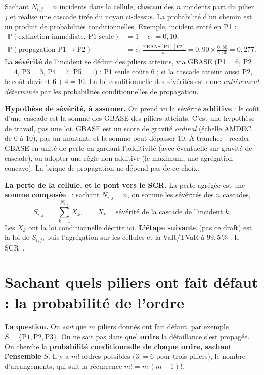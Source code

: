 \documentclass[11pt,a4paper]{article}
\begin{document}
Sachant $N_{i,j}=n$ incidents dans la cellule, \textbf{chacun} des $n$ incidents part du
pilier~$j$ et réalise une cascade tirée du noyau ci-dessus. La probabilité d'un chemin est un
produit de probabilités conditionnelles. Exemple, incident entré en P1 :
\begin{align}
\mathbb P(\text{extinction immédiate, P1 seule}) &= 1-e_1 = 0{,}10, \\
\mathbb P(\text{propagation P1}\to\text{P2}) &= e_1\,\tfrac{\text{TRANS}[\text{P1}][\text{P2}]}{s_1} = 0{,}90\times\tfrac{0{,}80}{2{,}60} = 0{,}277 .
\end{align}
La \textbf{sévérité} de l'incident se déduit des piliers atteints, via GBASE
(P1$=6$, P2$=4$, P3$=3$, P4$=7$, P5$=1$) : \og{}P1 seule\fg{} coûte $6$ ; si la cascade atteint
aussi P2, le coût devient $6+4=10$. La loi conditionnelle des sévérités est donc
\emph{entièrement déterminée} par les probabilités conditionnelles de propagation.

\noindent\textbf{Hypothèse de sévérité, à assumer.} On prend ici la sévérité \textbf{additive} :
le coût d'une cascade est la somme des GBASE des piliers atteints. C'est une hypothèse de travail,
pas une loi. GBASE est un score de gravité \emph{ordinal} (échelle AMDEC de 0 à 10), pas un
montant, et la somme peut dépasser 10. À trancher : recaler GBASE en unité de perte en gardant
l'additivité (avec éventuelle sur-gravité de cascade), ou adopter une règle non additive (le
maximum, une agrégation concave). La brique de propagation ne dépend pas de ce choix.

\begin{cle}
\textbf{La perte de la cellule, et le pont vers le SCR.} La perte agrégée est une
\textbf{somme composée}~\cite{Buhlmann1970,KlugmanPanjerWillmot} : sachant $N_{i,j}=n$, on somme
les sévérités des $n$ cascades,
\[
S_{i,j} \;=\; \sum_{k=1}^{N_{i,j}} X_k, \qquad
X_k = \text{sévérité de la cascade de l'incident } k .
\]
Les $X_k$ ont la loi conditionnelle décrite ici. \textbf{L'étape suivante} (pas ce draft) est
la loi de $S_{i,j}$, puis l'agrégation sur les cellules et la VaR/TVaR à $99{,}5\,\%$ : le
SCR~\cite{mcneil2015,SolvencyII2009}.
\end{cle}

\section{Sachant quels piliers ont fait défaut : la probabilité de l'ordre}

\begin{cle}
\textbf{La question.} On \emph{sait} que $m$ piliers donnés ont fait défaut, par exemple
$S=\{\text{P1},\text{P2},\text{P3}\}$. On ne sait pas dans quel \textbf{ordre} la défaillance
s'est propagée. On cherche la \textbf{probabilité conditionnelle de chaque ordre, sachant
l'ensemble} $S$. Il y a $m!$ ordres possibles ($3!=6$ pour trois piliers), le nombre
d'arrangements, qui suit la récurrence $m! = m\,(m-1)!$.
\end{cle}
\end{document}
